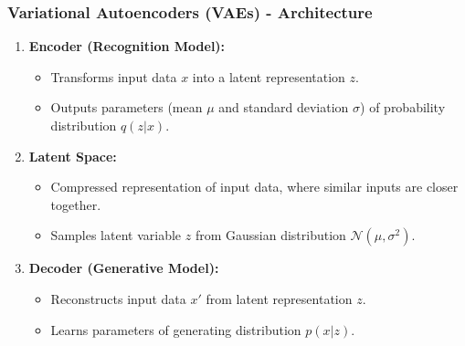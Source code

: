 \documentclass[aspectratio=169]{beamer}
\begin{document}
\begin{frame}[fragile]
    \frametitle{Variational Autoencoders (VAEs) - Architecture}
    \begin{enumerate}
        \item \textbf{Encoder (Recognition Model):}
        \begin{itemize}
            \item Transforms input data \( x \) into a latent representation \( z \).
            \item Outputs parameters (mean \( \mu \) and standard deviation \( \sigma \)) of probability distribution \( q(z|x) \).
        \end{itemize}
        
        \item \textbf{Latent Space:}
        \begin{itemize}
            \item Compressed representation of input data, where similar inputs are closer together.
            \item Samples latent variable \( z \) from Gaussian distribution \( \mathcal{N}(\mu, \sigma^2) \).
        \end{itemize}

        \item \textbf{Decoder (Generative Model):}
        \begin{itemize}
            \item Reconstructs input data \( x' \) from latent representation \( z \).
            \item Learns parameters of generating distribution \( p(x|z) \).
        \end{itemize}
    \end{enumerate}
\end{frame}
\end{document}
